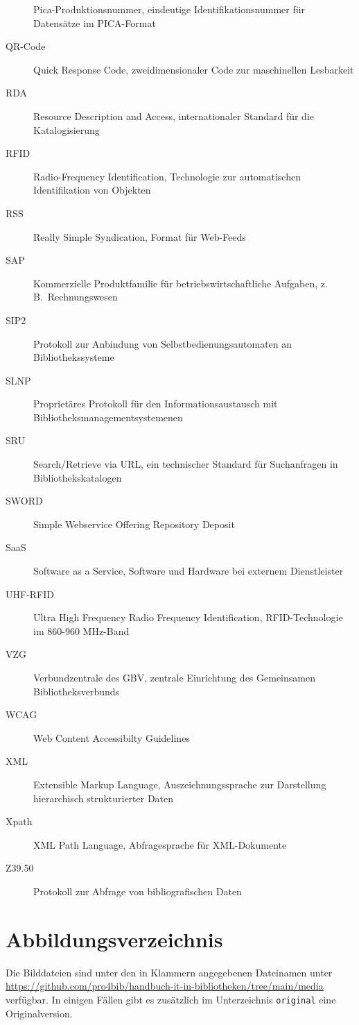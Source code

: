 \documentclass[
  11pt,
  letterpaper,
  DIV=11,
  twoside]{scrreprt}
\begin{document}
\begin{description}
Pica-Produktionsnummer, eindeutige Identifikationsnummer für Datensätze
im PICA-Format
\item[{QR-Code}]
Quick Response Code, zweidimensionaler Code zur maschinellen Lesbarkeit
\item[{RDA}]
Resource Description and Access, internationaler Standard für die
Katalogisierung
\item[{RFID}]
Radio-Frequency Identification, Technologie zur automatischen
Identifikation von Objekten
\item[{RSS}]
Really Simple Syndication, Format für Web-Feeds
\item[{SAP}]
Kommerzielle Produktfamilie für betriebswirtschaftliche Aufgaben,
z.\,B.~Rechnungswesen
\item[{SIP2}]
Protokoll zur Anbindung von Selbstbedienungsautomaten an
Bibliothekssysteme
\item[{SLNP}]
Proprietäres Protokoll für den Informationsaustausch mit
Bibliotheksmanagementsystemenen
\item[{SRU}]
Search/Retrieve via URL, ein technischer Standard für Suchanfragen in
Bibliothekskatalogen
\item[{SWORD}]
Simple Webservice Offering Repository Deposit
\item[{SaaS}]
Software as a Service, Software und Hardware bei externem Dienstleister
\item[{UHF-RFID}]
Ultra High Frequency Radio Frequency Identification, RFID-Technologie im
860-960 MHz-Band
\item[{VZG}]
Verbundzentrale des GBV, zentrale Einrichtung des Gemeinsamen
Bibliotheksverbunds
\item[{WCAG}]
Web Content Accessibilty Guidelines
\item[{XML}]
Extensible Markup Language, Auszeichnungssprache zur Darstellung
hierarchisch strukturierter Daten
\item[{Xpath}]
XML Path Language, Abfragesprache für XML-Dokumente
\item[{Z39.50}]
Protokoll zur Abfrage von bibliografischen Daten
\end{description}

\chapter{Abbildungsverzeichnis}\label{sec-abbildungen}

Die Bilddateien sind unter den in Klammern angegebenen Dateinamen unter
\url{https://github.com/pro4bib/handbuch-it-in-bibliotheken/tree/main/media}
verfügbar. In einigen Fällen gibt es zusätzlich im Unterzeichnis
\texttt{original} eine Originalversion.
\end{document}
